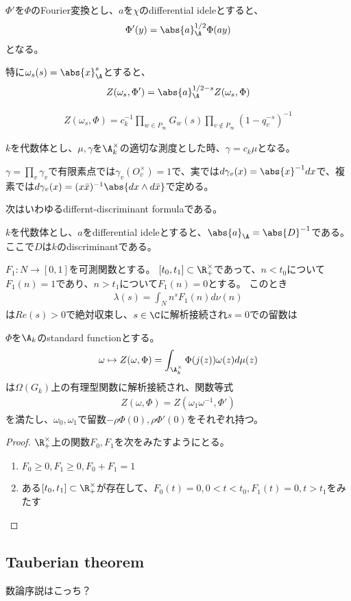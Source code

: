 \documentclass{jsarticle}
\begin{document}
$\Phi'$を$\Phi$のFourier変換とし、$a$を$\chi$のdifferential ideleとすると、
\begin{align*}
\Phi'(y)=\abs{a}^{1/2}_{\A}\Phi(ay)
\end{align*}
となる。

特に$\omega_s(s)=\abs{x}^s_{\A}$とすると、
\begin{align}
Z(\omega_s, \Phi')=\abs{a}^{1/2-s}_{\A}Z(\omega_s,\Phi)
\end{align}

\begin{align}
Z(\omega_s,\Phi)=c_k^{-1}\prod_{w\in P_\infty}G_w(s)\prod_{v\notin P_\infty}(1-q_v^{-s})^{-1}
\end{align}

\begin{prop}[Proposition 12, p.128]
$k$を代数体とし、$\mu, \gamma$を$\A_k^\times$の適切な測度とした時、$\gamma=c_k\mu$となる。

$\gamma=\prod_v\gamma_v$で有限素点では$\gamma_v(O_v^\times)=1$で、実では$d\gamma_v(x)=\abs{x}^{-1}dx$で、複素では$d\gamma_v(x)=(x\bar{x})^{-1}\abs{dx\wedge d\bar{x}}$で定める。
\end{prop}

次はいわゆるdiffernt-discriminant formulaである。
\begin{prop}[Proposition 6, p.113]
$k$を代数体とし、$a$をdifferential ideleとすると、$\abs{a}_{\A}=\abs{D}^{-1}$である。ここで$D$は$k$のdiscriminantである。
\end{prop}

\begin{lem}[Lemma 6, p.121]
$F_1:N \to [0,1]$を可測関数とする。
$[t_0,t_1] \subset \R_+^\times$であって、$n<t_0$について$F_1(n)=1$であり、$n>t_1$について$F_1(n)=0$とする。
このとき
\begin{align*}
\lambda(s)=\int_Nn^sF_1(n)d\nu(n)
\end{align*}
は$Re(s)>0$で絶対収束し、$s\in\C$に解析接続され$s=0$での留数は
\end{lem}

\begin{thm}[Theorem 2, p.121]
$\Phi$を$\A_k$のstandard functionとする。
\begin{align*}
\omega \mapsto Z(\omega, \Phi)=\int_{\A_k^\times}\Phi(j(z))\omega(z)d\mu(z)
\end{align*}
は$\Omega(G_k)$上の有理型関数に解析接続され、関数等式
\begin{align*}
Z(\omega,\Phi)=Z(\omega_1\omega^{-1},\Phi')
\end{align*}
を満たし、$\omega_0, \omega_1$で留数$-\rho\Phi(0), \rho\Phi'(0)$をそれぞれ持つ。
\end{thm}
\begin{proof}
$\R^\times_+$上の関数$F_0, F_1$を次をみたすようにとる。
\begin{enumerate}
\item $F_0\geq0, F_1\geq0, F_0+F_1=1$
\item ある$[t_0,t_1] \subset \R^\times_+$が存在して、$F_0(t)=0, 0<t<t_0, F_1(t)=0, t>t_1$をみたす
\end{enumerate}
\end{proof}

\subsection{Tauberian theorem}
数論序説はこっち？
\end{document}
